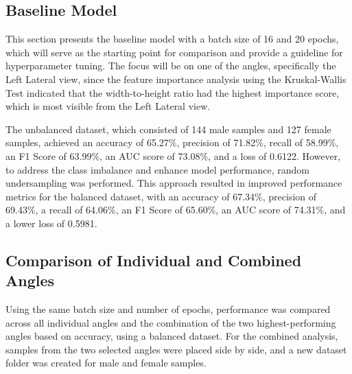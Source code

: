 \subsection{Baseline Model}
This section presents the baseline model with a batch size of 16 and 20 epochs, which will serve as the starting point for comparison and provide a guideline for hyperparameter tuning. The focus will be on one of the angles, specifically the Left Lateral view, since the feature importance analysis using the Kruskal-Wallis Test indicated that the width-to-height ratio had the highest importance score, which is most visible from the Left Lateral view.

The unbalanced dataset, which consisted of 144 male samples and 127 female samples, achieved an accuracy of 65.27\%, precision of 71.82\%, recall of 58.99\%, an F1 Score of 63.99\%, an AUC score of 73.08\%, and a loss of 0.6122. However, to address the class imbalance and enhance model performance, random undersampling was performed. This approach resulted in improved performance metrics for the balanced dataset, with an accuracy of 67.34\%, precision of 69.43\%, a recall of 64.06\%, an F1 Score of 65.60\%, an AUC score of 74.31\%, and a lower loss of 0.5981.

\vspace{0.5cm}
\begin{table}[H]
	\centering
	\caption{Performance metrics for unbalanced vs. balanced datasets (Batch Size: 16, Epochs: 20).}
	\label{tab:unbalanced-balanced}
\end{table}

\subsection{Comparison of Individual and Combined Angles}
\vspace{-0.5 cm}
Using the same batch size and number of epochs, performance was compared across all individual angles and the combination of the two highest-performing angles based on accuracy, using a balanced dataset. For the combined analysis, samples from the two selected angles were placed side by side, and a new dataset folder was created for male and female samples. 

